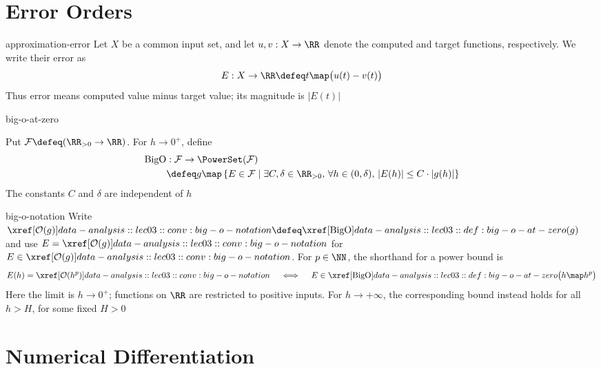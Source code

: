 \documentclass[12pt]{article}
\numberwithin{figure}{section}
\begin{document}

\section{Error Orders}

\begin{conv}{approximation-error}
  Let $X$ be a common input set, and let $u,v:X\to\RR$ denote the
  computed and target functions, respectively. We write their error as
  \[
    E:X\to\RR\defeq t\map\bigl(u(t)-v(t)\bigr)
  \]
  Thus error means computed value minus target value; its magnitude is
  $|E(t)|$
\end{conv}

\begin{dfn}{big-o-at-zero}
  \leavevmode\par
  \begingroup\color{notesmissingprereq}
  \par\smallskip
  Put $\mathcal F\defeq(\RR_{>0}\to\RR)$. For $h\to0^+$, define
  \[
    \begin{aligned}
      \mathrm{BigO}&:\mathcal F\to\PowerSet(\mathcal F)\\
      &\defeq g\map\left\{E\in\mathcal F\;\middle|\;
        \exists C,\delta\in\RR_{>0},\,\forall h\in(0,\delta),\,
        |E(h)|\leq C\cdot|g(h)|\right\}
    \end{aligned}
  \]
  The constants $C$ and $\delta$ are independent of $h$
  \par\endgroup
\end{dfn}

\begin{conv}{big-o-notation}
  Write $\OrderOf{g}\defeq\BigOClass(g)$ and use
  $E=\OrderOf{g}$ for $E\in\OrderOf{g}$.
  For $p\in\NN$, the shorthand for a power bound is
  \[
    E(h)=\OrderOf{h^p}\quad\iff\quad
    E\in\BigOClass\bigl(h\map h^p\bigr)
  \]
  Here the limit is $h\to0^+$; functions on $\RR$ are restricted to
  positive inputs. For $h\to+\infty$, the corresponding bound instead
  holds for all $h>H$, for some fixed $H>0$
\end{conv}

\section{Numerical Differentiation}
\end{document}
